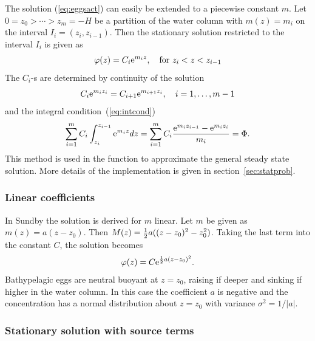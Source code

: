 The solution (\ref{eq:eggsact}) can easily be extended to a piecewise
constant $m$.
Let $0 = z_0 > \cdots > z_m = -H$ be a partition of the water column
with $m(z) = m_i$ on the interval $I_i = (z_i, z_{i-1})$.
Then the stationary solution restricted to the interval $I_i$ is
given as
\begin{equation}\label{eq:pwconst}
  \varphi(z) = C_i \mathrm{e}^{m_i z}, \quad \mbox{for} \ z_i < z < z_{i-1}
\end{equation}
The $C_i$-s are determined by continuity
of the solution
\begin{equation}
  C_i \mathrm{e}^{m_i z_i} = C_{i+1} \mathrm{e}^{m_{i+1} z_i}, \quad  i = 1, \ldots, m-1
\end{equation}
and the integral condition~(\ref{eq:intcond})
\begin{equation}
   \sum_{i = 1}^m C_i \int_{z_i}^{z_{i-1}} \mathrm{e}^{m_i z} dz
   = \sum_{i = 1}^m C_i \frac{\mathrm{e}^{m_i z_{i-1}} - \mathrm{e}^{m_i z_i}}{m_i}
   = \Phi .
\end{equation}
This method is used in the function  to approximate the
general steady state solution. More details of the implementation is
given in section~\ref{sec:statprob}.


\subsubsection{Linear coefficients}

In Sundby  the solution is derived for $m$ linear.
Let $m$ be given as $m(z) = a (z-z_0)$. Then $M(z) =
\frac{1}{2} a ((z - z_0)^2 - z_0^2)$. Taking the last term into the
constant $C$, the solution becomes
\begin{equation}
  \varphi(z) = C \mathrm{e}^{\frac{1}{2} a (z - z_0)^2} .
\end{equation}
Bathypelagic eggs are neutral buoyant at $z = z_0$, raising if deeper
and sinking if higher in the water column. In this case the coefficient
$a$ is negative and the concentration has a normal distribution about $z =
z_0$ with variance $\sigma^2 = {1 / |a|}$.



\subsubsection{Stationary solution with source terms}

